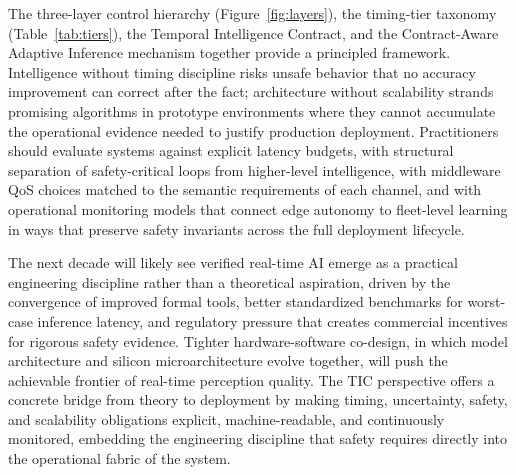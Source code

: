 \documentclass[smallextended]{svjour3}
\begin{document}
The three-layer control hierarchy (Figure~\ref{fig:layers}), the timing-tier taxonomy (Table~\ref{tab:tiers}), the Temporal Intelligence Contract, and the Contract-Aware Adaptive Inference mechanism together provide a principled framework. Intelligence without timing discipline risks unsafe behavior that no accuracy improvement can correct after the fact; architecture without scalability strands promising algorithms in prototype environments where they cannot accumulate the operational evidence needed to justify production deployment. Practitioners should evaluate systems against explicit latency budgets, with structural separation of safety-critical loops from higher-level intelligence, with middleware QoS choices
matched to the semantic requirements of each channel, and with operational monitoring models that connect edge autonomy to fleet-level learning in ways that preserve safety invariants across the full deployment lifecycle.

The next decade will likely see verified real-time AI emerge as a practical engineering discipline rather than a theoretical aspiration, driven by the convergence of improved formal tools, better standardized benchmarks for worst-case inference latency, and regulatory pressure that creates commercial incentives for rigorous safety evidence. Tighter hardware-software co-design, in which model architecture and silicon microarchitecture evolve together, will push the achievable frontier of real-time perception quality. The TIC perspective offers a concrete bridge from theory to deployment by making timing, uncertainty, safety, and scalability obligations explicit, machine-readable, and continuously monitored, embedding the engineering discipline that safety requires directly into the operational fabric of the system.

\end{document}
